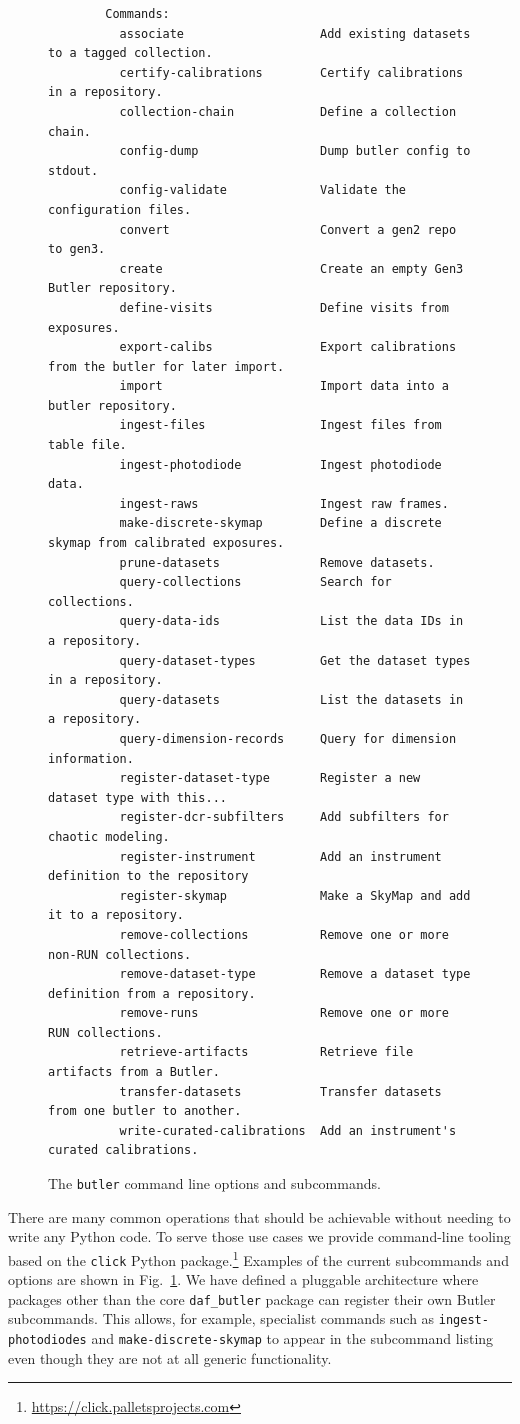 \documentclass[]{spie}
\begin{document}
\begin{figure}
\begin{small}
\begin{verbatim}
        Commands:
          associate                   Add existing datasets to a tagged collection.
          certify-calibrations        Certify calibrations in a repository.
          collection-chain            Define a collection chain.
          config-dump                 Dump butler config to stdout.
          config-validate             Validate the configuration files.
          convert                     Convert a gen2 repo to gen3.
          create                      Create an empty Gen3 Butler repository.
          define-visits               Define visits from exposures.
          export-calibs               Export calibrations from the butler for later import.
          import                      Import data into a butler repository.
          ingest-files                Ingest files from table file.
          ingest-photodiode           Ingest photodiode data.
          ingest-raws                 Ingest raw frames.
          make-discrete-skymap        Define a discrete skymap from calibrated exposures.
          prune-datasets              Remove datasets.
          query-collections           Search for collections.
          query-data-ids              List the data IDs in a repository.
          query-dataset-types         Get the dataset types in a repository.
          query-datasets              List the datasets in a repository.
          query-dimension-records     Query for dimension information.
          register-dataset-type       Register a new dataset type with this...
          register-dcr-subfilters     Add subfilters for chaotic modeling.
          register-instrument         Add an instrument definition to the repository
          register-skymap             Make a SkyMap and add it to a repository.
          remove-collections          Remove one or more non-RUN collections.
          remove-dataset-type         Remove a dataset type definition from a repository.
          remove-runs                 Remove one or more RUN collections.
          retrieve-artifacts          Retrieve file artifacts from a Butler.
          transfer-datasets           Transfer datasets from one butler to another.
          write-curated-calibrations  Add an instrument's curated calibrations.
    \end{verbatim}
    \end{small}
    \caption{The \texttt{butler} command line options and subcommands.}
    \label{fig:butler-cli}
\end{figure}

There are many common operations that should be achievable without needing to write any Python code.
To serve those use cases we provide command-line tooling based on the \texttt{click} Python package.\footnote{\url{https://click.palletsprojects.com}}
Examples of the current subcommands and options are shown in Fig.~\ref{fig:butler-cli}.
We have defined a pluggable architecture where packages other than the core \texttt{daf\_butler} package can register their own Butler subcommands.
This allows, for example, specialist commands such as \texttt{ingest-photodiodes} and \texttt{make-discrete-skymap} to appear in the subcommand listing even though they are not at all generic functionality.
\end{document}
